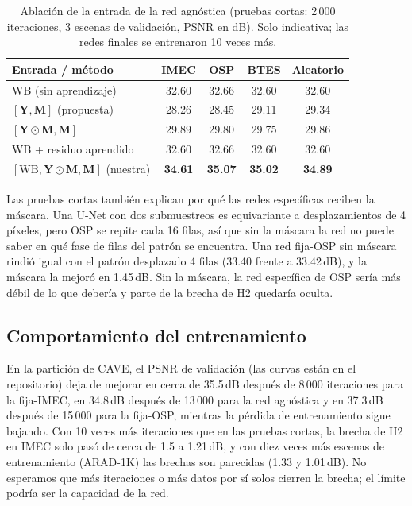 \documentclass{article}
\def\Y{{\mathbf Y}}
\def\M{{\mathbf M}}
\newcommand{\wb}{\mathrm{WB}}
\begin{document}
\begin{table}[t]
\centering
\caption{Ablación de la entrada de la red agnóstica (pruebas cortas:
2\,000 iteraciones, 3 escenas de validación, PSNR en dB). Solo indicativa;
las redes finales se entrenaron 10 veces más.}
\label{tab:ablation}
\footnotesize
\setlength{\tabcolsep}{3.5pt}
\begin{tabular}{|l|c|c|c|c|}
\hline
Entrada / método & IMEC & OSP & BTES & Aleatorio \\
\hline
WB (sin aprendizaje)          & 32.60 & 32.66 & 32.60 & 32.60 \\
\hline
$[\Y,\M]$ (propuesta)          & 28.26 & 28.45 & 29.11 & 29.34 \\
$[\Y\odot\M,\M]$              & 29.89 & 29.80 & 29.75 & 29.86 \\
WB + residuo aprendido        & 32.60 & 32.66 & 32.60 & 32.60 \\
$[\wb,\Y\odot\M,\M]$ (nuestra) & \textbf{34.61} & \textbf{35.07} & \textbf{35.02} & \textbf{34.89} \\
\hline
\end{tabular}
\end{table}

Las pruebas cortas también explican por qué las redes específicas reciben la
máscara. Una U-Net con dos submuestreos es equivariante a desplazamientos de
4 píxeles, pero OSP se repite cada 16 filas, así que sin la máscara la red no
puede saber en qué fase de filas del patrón se encuentra. Una red fija-OSP
sin máscara rindió igual con el patrón desplazado 4 filas (33.40 frente a
33.42\,dB), y la máscara la mejoró en 1.45\,dB. Sin la máscara, la red
específica de OSP sería más débil de lo que debería y parte de la brecha de
H2 quedaría oculta.

\subsection{Comportamiento del entrenamiento}

En la partición de CAVE, el PSNR de validación (las curvas están en el
repositorio) deja de mejorar en cerca de 35.5\,dB después de 8\,000
iteraciones para la fija-IMEC, en 34.8\,dB después de 13\,000 para la red
agnóstica y en 37.3\,dB después de 15\,000 para la fija-OSP, mientras la
pérdida de entrenamiento sigue bajando. Con 10 veces más iteraciones que en
las pruebas cortas, la brecha de H2 en IMEC solo pasó de cerca de 1.5 a
1.21\,dB, y con diez veces más escenas de entrenamiento (ARAD-1K) las
brechas son parecidas (1.33 y 1.01\,dB). No esperamos que más iteraciones o
más datos por sí solos cierren la brecha; el límite podría ser la capacidad
de la red.
\end{document}
